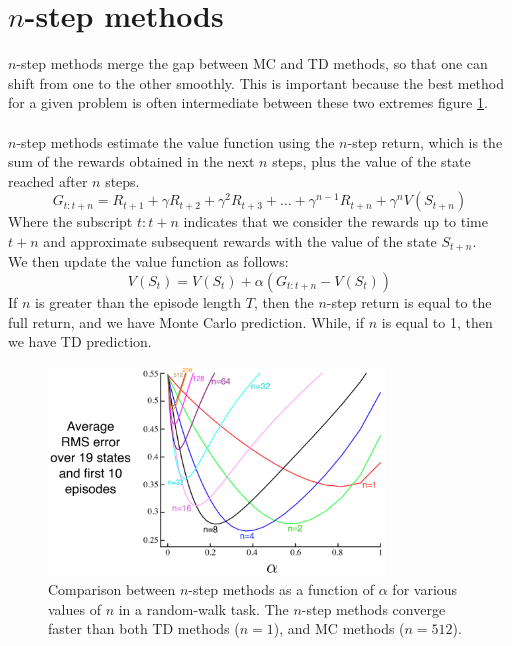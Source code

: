 \section{$n$-step methods}
$n$-step methods merge the gap between MC and TD methods, so that one can shift from one to the other smoothly. This is important because the best method for a given problem is often intermediate between these two extremes figure \ref{fig:n-step-comparison}.\\\\
$n$-step methods estimate the value function using the $n$-step return, which is the sum of the rewards obtained in the next $n$ steps, plus the value of the state reached after $n$ steps.\\
\begin{equation}
    G_{t:t+n} = R_{t+1} + \gamma R_{t+2} + \gamma^2 R_{t+3} + \dots + \gamma^{n-1} R_{t+n} + \gamma^n V(S_{t+n})
    \label{n-step-return}
\end{equation}
Where the subscript $t:t+n$ indicates that we consider the rewards up to time $t+n$ and approximate subsequent rewards with the value of the state $S_{t+n}$.\\
We then update the value function as follows:
\begin{equation}
    V(S_t) = V(S_t) + \alpha (G_{t:t+n} - V(S_t))
    \label{n-step-update}
\end{equation}
If $n$ is greater than the episode length $T$, then the $n$-step return is equal to the full return, and we have Monte Carlo prediction. While, if $n$ is equal to 1, then we have TD prediction.
\begin{figure}[H]
    \centering
    \includegraphics[width=0.8\textwidth]{images/n-step-comparison.png}
    \caption{Comparison between $n$-step methods as a function of $\alpha$ for various values of $n$ in a random-walk task. The $n$-step methods converge faster than both TD methods ($n=1$), and  MC methods ($n=512$).}
    \label{fig:n-step-comparison}
\end{figure}
